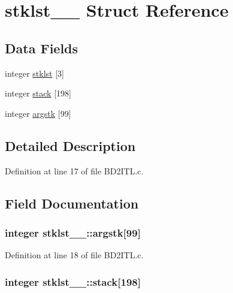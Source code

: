 \hypertarget{structstklst__1__}{}\section{stklst\+\_\+\_\+ Struct Reference}
\label{structstklst__1__}
\subsection*{Data Fields}
\begin{DoxyCompactItemize}
\item 
integer \hyperlink{structstklst__1___adea743dfc05d4bf63ce29ff9493ed5b1}{stklst} \mbox{[}3\mbox{]}
\item 
integer \hyperlink{structstklst__1___a296f80455eb620f65531ebce2e7cd46f}{stack} \mbox{[}198\mbox{]}
\item 
integer \hyperlink{structstklst__1___af8a377fbfeffea1acc0f452bae0fb5cf}{argstk} \mbox{[}99\mbox{]}
\end{DoxyCompactItemize}


\subsection{Detailed Description}


Definition at line 17 of file B\+D2\+I\+T\+L.\+c.



\subsection{Field Documentation}
\subsubsection[{\texorpdfstring{argstk}{argstk}}]{\setlength{\rightskip}{0pt plus 5cm}integer stklst\+\_\+\_\+\+::argstk\mbox{[}99\mbox{]}}\hypertarget{structstklst__1___af8a377fbfeffea1acc0f452bae0fb5cf}{}\label{structstklst__1___af8a377fbfeffea1acc0f452bae0fb5cf}


Definition at line 18 of file B\+D2\+I\+T\+L.\+c.

\subsubsection[{\texorpdfstring{stack}{stack}}]{\setlength{\rightskip}{0pt plus 5cm}integer stklst\+\_\+\_\+\+::stack\mbox{[}198\mbox{]}}\hypertarget{structstklst__1___a296f80455eb620f65531ebce2e7cd46f}{}\label{structstklst__1___a296f80455eb620f65531ebce2e7cd46f}



